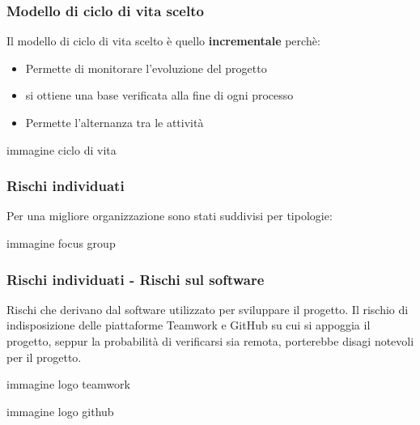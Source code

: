 \begin{frame}
  \frametitle{Modello di ciclo di vita scelto}
  Il modello di ciclo di vita scelto è quello \textbf{incrementale} perchè:
  \begin{itemize}
  \item Permette di monitorare l'evoluzione del progetto
  \item si ottiene una base verificata alla fine di ogni processo
  \item Permette l'alternanza tra le attività
  \end{itemize}

  immagine ciclo di vita
\end{frame}


\begin{frame}
  \frametitle{Rischi individuati}
  Per una migliore organizzazione sono stati suddivisi per tipologie:

    immagine focus group
\end{frame}

\begin{frame}
  \frametitle{Rischi individuati - Rischi sul software}
  Rischi che derivano dal software utilizzato per sviluppare il progetto.
  Il rischio di indisposizione delle piattaforme Teamwork e GitHub su cui si appoggia il progetto, seppur la probabilità di verificarsi sia remota, porterebbe disagi notevoli per il progetto.

  immagine logo teamwork

  immagine logo github
\end{frame}

